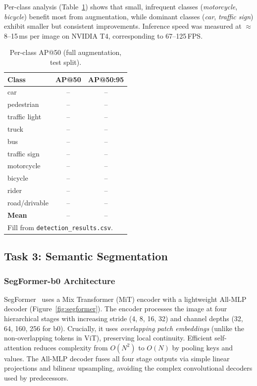 \documentclass[10pt,twocolumn]{article}
\begin{document}
Per-class analysis (Table~\ref{tab:perclass}) shows that small, infrequent
classes (\textit{motorcycle}, \textit{bicycle}) benefit most from augmentation,
while dominant classes (\textit{car}, \textit{traffic sign}) exhibit smaller
but consistent improvements.  Inference speed was measured at $\approx$8--15\,ms
per image on NVIDIA T4, corresponding to 67--125\,FPS.

\begin{table}[H]
\centering
\caption{Per-class AP@50 (full augmentation, test split).}
\label{tab:perclass}
\small
\begin{tabular}{@{}lcc@{}}
\toprule
\textbf{Class} & \textbf{AP@50} & \textbf{AP@50:95} \\
\midrule
car            & --   & --  \\
pedestrian     & --   & --  \\
traffic light  & --   & --  \\
truck          & --   & --  \\
bus            & --   & --  \\
traffic sign   & --   & --  \\
motorcycle     & --   & --  \\
bicycle        & --   & --  \\
rider          & --   & --  \\
road/drivable  & --   & --  \\
\midrule
\textbf{Mean}  & --   & --  \\
\bottomrule
\multicolumn{3}{l}{\scriptsize Fill from \texttt{detection\_results.csv}.}
\end{tabular}
\end{table}

\subsection{Task 3: Semantic Segmentation}

\subsubsection{SegFormer-b0 Architecture}
\label{sec:seg_arch}

SegFormer~\cite{xie2021segformer} uses a Mix Transformer (MiT) encoder with a
lightweight All-MLP decoder (Figure~\ref{fig:segformer}).
The encoder processes the image at four hierarchical stages with increasing
stride (4, 8, 16, 32) and channel depths (32, 64, 160, 256 for b0).
Crucially, it uses \textit{overlapping patch embeddings} (unlike the
non-overlapping tokens in ViT), preserving local continuity.
Efficient self-attention reduces complexity from $O(N^2)$ to $O(N)$ by
pooling keys and values.  The All-MLP decoder fuses all four stage outputs via
simple linear projections and bilinear upsampling, avoiding the complex
convolutional decoders used by predecessors.
\end{document}
